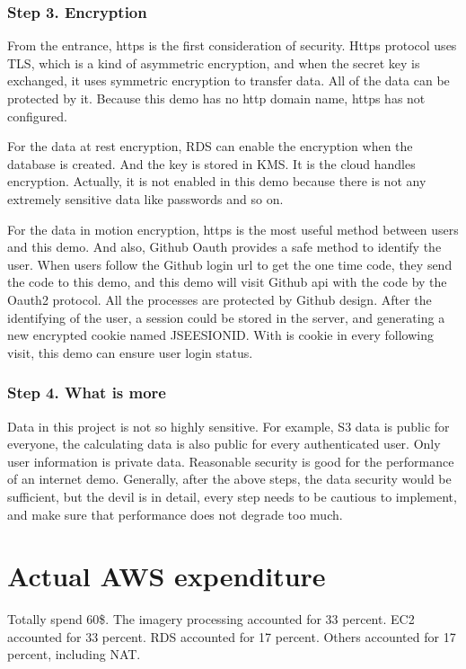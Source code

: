 \documentclass[conference]{IEEEtran}
\begin{document}
\subsubsection{Step 3. Encryption}

From the entrance, https is the first consideration of security. Https protocol uses TLS, which is a kind of asymmetric encryption, and when the secret key is exchanged, 
it uses symmetric encryption to transfer data. All of the data can be protected by it. Because this demo has no http domain name, https has not configured.

For the data at rest encryption, RDS can enable the encryption when the database is created. And the key is stored in KMS. It is the cloud handles encryption. Actually, it 
is not enabled in this demo because there is not any extremely sensitive data like passwords and so on.

For the data in motion encryption, https is the most useful method between users and this demo. And also, Github Oauth provides a safe method to identify the user. When 
users follow the Github login url to get the one time code, they send the code to this demo, and this demo will visit Github api with the code by the Oauth2 protocol. All the 
processes are protected by Github design. After the identifying of the user, a session could be stored in the server, and generating a new encrypted cookie named JSEESIONID. With is 
cookie in every following visit, this demo can ensure user login status.

\subsubsection{Step 4. What is more}

Data in this project is not so highly sensitive. For example, S3 data is public for everyone, the calculating data is also public for every authenticated user. Only user 
information is private data. Reasonable security is good for the performance of an internet demo. Generally, after the above steps, the data 
security would be sufficient, but the devil is in detail, every step needs to be cautious to implement, and make sure that performance does not degrade too much.

\section{Actual AWS expenditure}

Totally spend 60\$. The imagery processing accounted for 33 percent. EC2 accounted for 33 percent. RDS accounted for 17 percent. Others accounted for 17 percent, including NAT.
\end{document}
